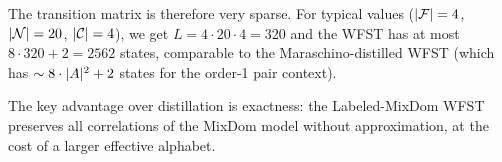 The transition matrix is therefore very sparse.
For typical values ($|\mathcal{F}| = 4$, $|\mathcal{N}| = 20$, $|\mathcal{C}| = 4$),
we get $L = 4 \cdot 20 \cdot 4 = 320$ and the WFST has at most $8 \cdot 320 + 2 = 2562$ states,
comparable to the Maraschino-distilled WFST
(which has $\sim 8 \cdot |A|^2 + 2$ states for the order-1 pair context).

The key advantage over distillation is exactness: the Labeled-MixDom WFST preserves
all correlations of the MixDom model without approximation, at the cost of a larger
effective alphabet.
